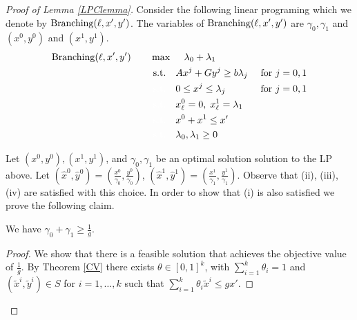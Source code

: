 \documentclass[runningheads]{llncs}
\begin{document}
\begin{proof}[Proof of Lemma \ref{LPClemma}] 
	
	Consider the following linear programing which we denote by $\operatorname{Branching}(\ell,x',y')$. The variables of $\operatorname{Branching}(\ell,x',y')$ are $\gamma_0,\gamma_1$ and $(x^0,y^0)$ and $(x^1,y^1)$. 
	\begin{align}
		\LPC(\ell,x',y')\quad\quad& \max\quad \;\lambda_0+\lambda_1\\
		&\;\text{s.t.} \quad Ax^j + Gy^j\geq b\lambda_j & \mbox{ for $j=0,1$} \label{feasibility}\\
		&\;{\color{white}{\text{s.t.}} }\quad 0 \leq x^j \leq \lambda_j &\mbox{ for $j=0,1$}\label{bound}\\
		&\;{\color{white}{\text{s.t.}} }\quad x^0_\ell = 0,\; x^1_\ell =\lambda_1\label{branchcoordinate}\\
		&\;{\color{white}{\text{s.t.}} }\quad x^0 + x^1 \leq x'\label{packing}\\
		&\;{\color{white}{\text{s.t.}} }\quad \lambda_0,\lambda_1 \geq 0
	\end{align}
	
	Let $(x^0,y^0),(x^1,y^1)$, and $\gamma_0,\gamma_1$ be an optimal solution solution to the LP above. Let $(\hat{x}^0,\hat{y}^0) = (\frac{x^0}{\gamma_0},\frac{y^0}{\gamma_0})$, $(\hat{x}^1,\hat{y}^1) = (\frac{x^1}{\gamma_1},\frac{y^1}{\gamma_1})$. Observe that  (ii), (iii), (iv) are satisfied with this choice. In order to show that (i) is also satisfied we prove the following claim.
	
	\begin{claim}\label{CVexists}
		We have $\gamma_0 + \gamma_1\geq \frac{1}{g}$.
	\end{claim}
	\begin{proof}
		We show that there is a feasible solution that achieves the objective value of $\frac{1}{g}$. By Theorem \ref{CV} there exists $\theta \in [0,1]^k$, with $\sum_{i=1}^{k}\theta_i = 1$ and $(\tilde{x}^i,\tilde{y}^i)\in S$ for $i=1,\ldots,k$ such that 
		$\sum_{i=1}^{k}\theta_i \tilde{x}^i\leq gx'$. 
		

\end{proof}
\end{proof}
\end{document}
